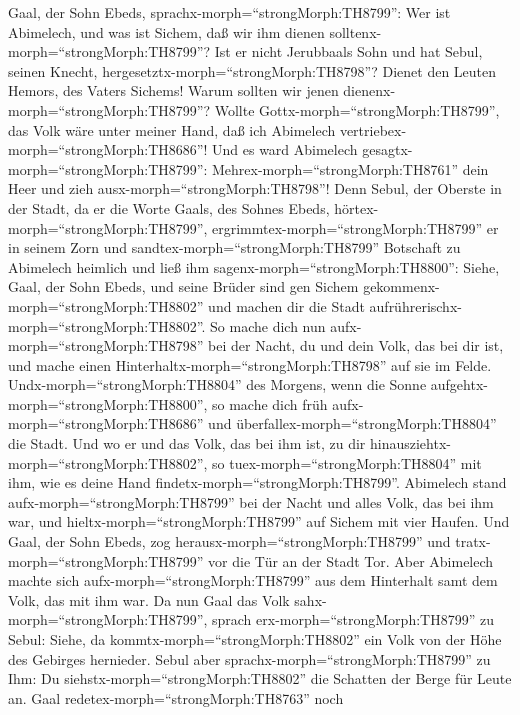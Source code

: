 Gaal, der Sohn Ebeds, sprachx-morph=``strongMorph:TH8799'': Wer ist
Abimelech, und was ist Sichem, daß wir ihm dienen
solltenx-morph=``strongMorph:TH8799''? Ist er nicht Jerubbaals Sohn und
hat Sebul, seinen Knecht, hergesetztx-morph=``strongMorph:TH8798''?
Dienet den Leuten Hemors, des Vaters Sichems! Warum sollten wir jenen
dienenx-morph=``strongMorph:TH8799''?  Wollte
Gottx-morph=``strongMorph:TH8799'', das Volk wäre unter meiner Hand, daß
ich Abimelech vertriebex-morph=``strongMorph:TH8686''! Und es ward
Abimelech gesagtx-morph=``strongMorph:TH8799'':
Mehrex-morph=``strongMorph:TH8761'' dein Heer und zieh
ausx-morph=``strongMorph:TH8798''!  Denn Sebul, der Oberste
in der Stadt, da er die Worte Gaals, des Sohnes Ebeds,
hörtex-morph=``strongMorph:TH8799'',
ergrimmtex-morph=``strongMorph:TH8799'' er in seinem Zorn 
und sandtex-morph=``strongMorph:TH8799'' Botschaft zu Abimelech heimlich
und ließ ihm sagenx-morph=``strongMorph:TH8800'': Siehe, Gaal, der Sohn
Ebeds, und seine Brüder sind gen Sichem
gekommenx-morph=``strongMorph:TH8802'' und machen dir die Stadt
aufrührerischx-morph=``strongMorph:TH8802''.  So mache dich
nun aufx-morph=``strongMorph:TH8798'' bei der Nacht, du und dein Volk,
das bei dir ist, und mache einen
Hinterhaltx-morph=``strongMorph:TH8798'' auf sie im Felde. 
Undx-morph=``strongMorph:TH8804'' des Morgens, wenn die Sonne
aufgehtx-morph=``strongMorph:TH8800'', so mache dich früh
aufx-morph=``strongMorph:TH8686'' und
überfallex-morph=``strongMorph:TH8804'' die Stadt. Und wo er und das
Volk, das bei ihm ist, zu dir hinausziehtx-morph=``strongMorph:TH8802'',
so tuex-morph=``strongMorph:TH8804'' mit ihm, wie es deine Hand
findetx-morph=``strongMorph:TH8799''.  Abimelech stand
aufx-morph=``strongMorph:TH8799'' bei der Nacht und alles Volk, das bei
ihm war, und hieltx-morph=``strongMorph:TH8799'' auf Sichem mit vier
Haufen.  Und Gaal, der Sohn Ebeds, zog
herausx-morph=``strongMorph:TH8799'' und
tratx-morph=``strongMorph:TH8799'' vor die Tür an der Stadt Tor. Aber
Abimelech machte sich aufx-morph=``strongMorph:TH8799'' aus dem
Hinterhalt samt dem Volk, das mit ihm war.  Da nun Gaal das
Volk sahx-morph=``strongMorph:TH8799'', sprach
erx-morph=``strongMorph:TH8799'' zu Sebul: Siehe, da
kommtx-morph=``strongMorph:TH8802'' ein Volk von der Höhe des Gebirges
hernieder. Sebul aber sprachx-morph=``strongMorph:TH8799'' zu Ihm: Du
siehstx-morph=``strongMorph:TH8802'' die Schatten der Berge für Leute
an.  Gaal redetex-morph=``strongMorph:TH8763'' noch
